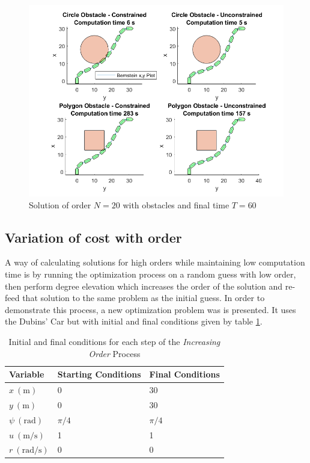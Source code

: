 \begin{figure}[h!]
\centering
\includegraphics[width=\textwidth]{Images/results/ostaclesfigures.png}
\caption{Solution of order $N=20$ with obstacles and final time $T=60$}
\label{fig:obstaclesfigures}
\end{figure}


\subsection{Variation of cost with order}

\par A way of calculating solutions for high orders while maintaining low computation time is by running the optimization process on a random guess with low order, then perform degree elevation which increases the order of the solution and re-feed that solution to the same problem as the initial guess. In order to demonstrate this process, a new optimization problem was is presented. It uses the Dubins' Car but with initial and final conditions given by table \ref{tab:increasingNproblem}. 

\begin{table}[h!]
\centering
\begin{tabular}{|l|l|l|}
\hline
Variable & Starting Conditions & Final Conditions \\ \hline
$x\ (\si{\meter})$ & 0 & 30 \\
$y\ (\si{\meter})$ & 0 & 30 \\
$\psi\ (\si{\radian})$ & $\pi/4$ & $\pi/4$ \\
$u\ (\si{\meter\per\second})$ & 1 & 1 \\
$r\ (\si{\radian\per\second})$ & 0 & 0 \\
\hline
\end{tabular}
\caption{Initial and final conditions for each step of the \textit{Increasing Order} Process}
\label{tab:increasingNproblem}
\end{table}


